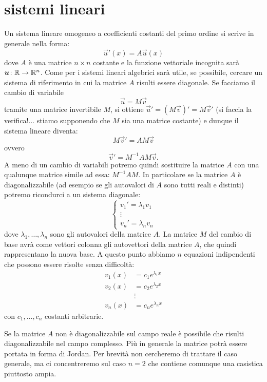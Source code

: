 \section{sistemi lineari}

Un sistema lineare omogeneo a coefficienti costanti del primo ordine si
scrive in generale nella forma:
\[
  \vec u'(x) = A \vec u(x)
\]
dove $A$ è una matrice $n\times n$ costante
e la funzione vettoriale incognita sarà
$\boldsymbol u \colon \mathbb R\to \mathbb R^n$.
Come per i sistemi lineari algebrici sarà utile, se possibile,
cercare un sistema di riferimento
in cui la matrice $A$ risulti essere diagonale. Se facciamo il cambio di variabile
\[
  \vec u = M \vec v
\]
tramite una matrice invertibile $M$, si ottiene $\vec u' = (M \vec v)' = M \vec v'$
(si faccia la verifica!... stiamo supponendo che $M$ sia una matrice costante)
e dunque il sistema lineare diventa:
\[
 M \vec v' = A M \vec v
\]
ovvero
\[
  \vec v' = M^{-1} A M \vec v.
\]
A meno di un cambio di variabili potremo quindi sostituire la matrice $A$
con una qualunque matrice simile ad essa: $M^{-1} A M$. In particolare se
la matrice $A$ è diagonalizzabile (ad esempio se gli autovalori di $A$ sono
tutti reali e distinti)
potremo ricondurci a un sistema diagonale:
\[
\begin{cases}
 v_1' = \lambda_1 v_1 \\
      \vdots\\
 v_n' = \lambda_n v_n
\end{cases}
\]
dove $\lambda_1, \dots, \lambda_n$ sono gli autovalori della matrice $A$.
La matrice $M$ del cambio di base avrà come vettori colonna gli autovettori
della matrice $A$, che quindi rappresentano la nuova base. A questo punto
abbiamo $n$ equazioni indipendenti che possono essere risolte
senza difficoltà:
\begin{align*}
  v_1(x) &= c_1 e^{\lambda_1 x}\\
  v_2(x) &= c_2 e^{\lambda_2 x}\\
  &\vdots \\
  v_n(x) &= c_n e^{\lambda_n x}
\end{align*}
con $c_1, \dots, c_n$ costanti arbitrarie.

Se la matrice $A$ non è diagonalizzabile sul campo reale è possibile che
risulti diagonalizzabile nel campo complesso. Più in generale la matrice
potrà essere portata in forma di Jordan. Per brevità non cercheremo di
trattare il caso generale, ma ci concentreremo sul caso $n=2$ che
contiene comunque una casistica piuttosto ampia.

